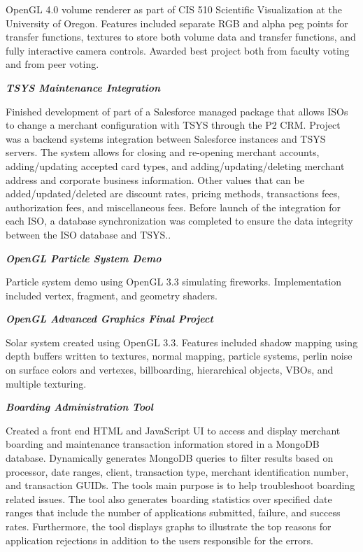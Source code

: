 \documentclass[margin,line]{res}
\begin{document}
\begin{resume}
\vspace{-.4cm}
OpenGL 4.0 volume renderer as part of CIS 510 Scientific Visualization at the University of Oregon. Features included separate RGB and alpha peg points for transfer functions, textures to store both volume data and transfer functions, and fully interactive camera controls. Awarded best project both from faculty voting and from peer voting. 

{\em \textbf{TSYS Maintenance Integration} }

\vspace{-.4cm}
Finished development of part of a Salesforce managed package that allows ISOs to change a merchant configuration with TSYS through the P2 CRM. Project was a backend systems integration between Salesforce instances and TSYS servers. The system allows for closing and re-opening merchant accounts, adding/updating accepted card types, and adding/updating/deleting merchant address and corporate business information. Other values that can be added/updated/deleted are discount rates, pricing methods, transactions fees, authorization fees, and miscellaneous fees. Before launch of the integration for each ISO, a database synchronization was completed to ensure the data integrity between the ISO database and TSYS..

{\em \textbf{OpenGL Particle System Demo} }

\vspace{-.4cm}
Particle system demo using OpenGL 3.3 simulating fireworks. Implementation included vertex, fragment, and geometry shaders.

{\em \textbf{OpenGL Advanced Graphics Final Project} }

\vspace{-.4cm}
Solar system created using OpenGL 3.3. Features included shadow mapping using depth buffers written to textures, normal mapping, particle systems, perlin noise on surface colors and vertexes, billboarding, hierarchical objects, VBOs, and multiple texturing.

{\em \textbf{Boarding Administration Tool} }

\vspace{-.4cm}
Created a front end HTML and JavaScript UI to access and display merchant boarding and maintenance transaction information stored in a MongoDB database. Dynamically generates MongoDB queries to filter results based on processor, date ranges, client, transaction type, merchant identification number, and transaction GUIDs. The tools main purpose is to help troubleshoot boarding related issues. The tool also generates boarding statistics over specified date ranges that include the number of applications submitted, failure, and success rates. Furthermore, the tool displays graphs to illustrate the top reasons for application rejections in addition to the users responsible for the errors.


\end{resume}
\end{document}
